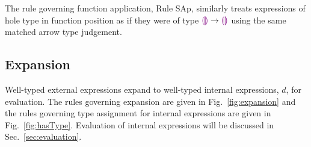 The rule governing function application, Rule {SAp}, similarly treats expressions of hole type in function position as if they were of type $\textcolor{violet}{\llparenthesis}\textcolor{violet}{\rrparenthesis} \rightarrow \textcolor{violet}{\llparenthesis}\textcolor{violet}{\rrparenthesis}$ using the same matched arrow type judgement.

\subsection{Expansion}
\label{sec:expansion}




Well-typed external expressions expand to well-typed internal expressions, $d$, for evaluation. The rules governing expansion are given in Fig.~\ref{fig:expansion} and the rules governing type assignment for internal expressions are given in Fig.~\ref{fig:hasType}. Evaluation of internal expressions will be discussed in Sec.~\ref{sec:evaluation}.

